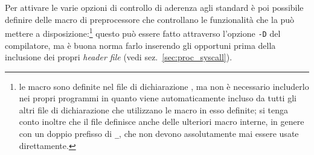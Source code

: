 Per attivare le varie opzioni di controllo di aderenza agli standard è poi
possibile definire delle macro di preprocessore che controllano le
funzionalità che la  può mettere a disposizione:\footnote{le macro
  sono definite nel file di dichiarazione , ma non è
  necessario includerlo nei propri programmi in quanto viene automaticamente
  incluso da tutti gli altri file di dichiarazione che utilizzano le macro in
  esso definite; si tenga conto inoltre che il file definisce anche delle
  ulteriori macro interne, in genere con un doppio prefisso di \texttt{\_},
  che non devono assolutamente mai essere usate direttamente. } questo può
essere fatto attraverso l'opzione \texttt{-D} del compilatore, ma è buona
norma farlo inserendo gli opportuni  prima della inclusione dei
propri \textit{header file} (vedi sez.~\ref{sec:proc_syscall}).

